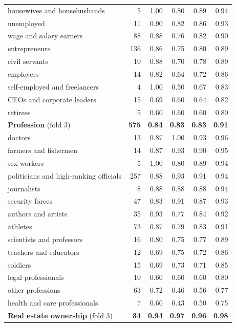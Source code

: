 \begin{table}[t]
\begin{tabular}{l r r r r r}
\quad housewives and househusbands & 5 & 1.00 & 0.80 & 0.89 & 0.94 \\
\quad unemployed & 11 & 0.90 & 0.82 & 0.86 & 0.93 \\
\quad wage and salary earners & 88 & 0.88 & 0.76 & 0.82 & 0.90 \\
\quad entrepreneurs & 136 & 0.86 & 0.75 & 0.80 & 0.89 \\
\quad civil servants & 10 & 0.88 & 0.70 & 0.78 & 0.89 \\
\quad employers & 14 & 0.82 & 0.64 & 0.72 & 0.86 \\
\quad self-employed and freelancers & 4 & 1.00 & 0.50 & 0.67 & 0.83 \\
\quad CEOs and corporate leaders & 15 & 0.69 & 0.60 & 0.64 & 0.82 \\
\quad retirees & 5 & 0.60 & 0.60 & 0.60 & 0.80 \\
\addlinespace
\textbf{Profession} (fold 3) & \textbf{575} & \textbf{0.84} & \textbf{0.83} & \textbf{0.83} & \textbf{0.91} \\
\quad doctors & 13 & 0.87 & 1.00 & 0.93 & 0.96 \\
\quad farmers and fishermen & 14 & 0.87 & 0.93 & 0.90 & 0.95 \\
\quad sex workers & 5 & 1.00 & 0.80 & 0.89 & 0.94 \\
\quad politicians and high-ranking officials & 257 & 0.88 & 0.93 & 0.91 & 0.94 \\
\quad journalists & 8 & 0.88 & 0.88 & 0.88 & 0.94 \\
\quad security forces & 47 & 0.83 & 0.91 & 0.87 & 0.93 \\
\quad authors and artists & 35 & 0.93 & 0.77 & 0.84 & 0.92 \\
\quad athletes & 73 & 0.87 & 0.79 & 0.83 & 0.91 \\
\quad scientists and professors & 16 & 0.80 & 0.75 & 0.77 & 0.89 \\
\quad teachers and educators & 12 & 0.69 & 0.75 & 0.72 & 0.86 \\
\quad soldiers & 15 & 0.69 & 0.73 & 0.71 & 0.85 \\
\quad legal professionals & 10 & 0.60 & 0.60 & 0.60 & 0.80 \\
\quad other professions & 63 & 0.72 & 0.46 & 0.56 & 0.77 \\
\quad health and care professionals & 7 & 0.60 & 0.43 & 0.50 & 0.75 \\
\addlinespace
\textbf{Real estate ownership} (fold 3) & \textbf{34} & \textbf{0.94} & \textbf{0.97} & \textbf{0.96} & \textbf{0.98} \\

\end{tabular}
\end{table}
